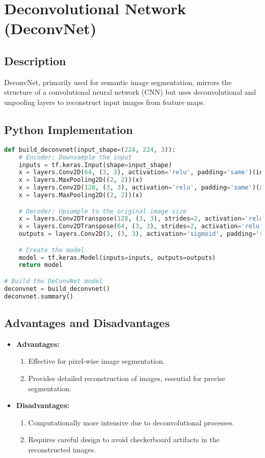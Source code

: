 \chapter{Deconvolutional Network (DeconvNet)}

\section{Description}
DeconvNet, primarily used for semantic image segmentation, mirrors the structure of a convolutional neural network (CNN) but uses deconvolutional and unpooling layers to reconstruct input images from feature maps.

\section{Python Implementation}
\begin{lstlisting}[language=Python]
def build_deconvnet(input_shape=(224, 224, 3)):
    # Encoder: Downsample the input
    inputs = tf.keras.Input(shape=input_shape)
    x = layers.Conv2D(64, (3, 3), activation='relu', padding='same')(inputs)
    x = layers.MaxPooling2D((2, 2))(x)
    x = layers.Conv2D(128, (3, 3), activation='relu', padding='same')(x)
    x = layers.MaxPooling2D((2, 2))(x)

    # Decoder: Upsample to the original image size
    x = layers.Conv2DTranspose(128, (3, 3), strides=2, activation='relu', padding='same')(x)
    x = layers.Conv2DTranspose(64, (3, 3), strides=2, activation='relu', padding='same')(x)
    outputs = layers.Conv2D(3, (3, 3), activation='sigmoid', padding='same')(x)

    # Create the model
    model = tf.keras.Model(inputs=inputs, outputs=outputs)
    return model

# Build the DeConvNet model
deconvnet = build_deconvnet()
deconvnet.summary()
\end{lstlisting}

\section{Advantages and Disadvantages}
\begin{itemize}
    \item \textbf{Advantages:}
    \begin{enumerate}
        \item Effective for pixel-wise image segmentation.
        \item Provides detailed reconstruction of images, essential for precise segmentation.
    \end{enumerate}
    \item \textbf{Disadvantages:}
    \begin{enumerate}
        \item Computationally more intensive due to deconvolutional processes.
        \item Requires careful design to avoid checkerboard artifacts in the reconstructed images.
    \end{enumerate}
\end{itemize}

